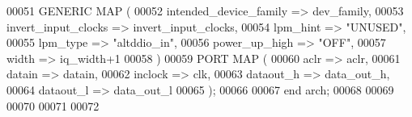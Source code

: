 \begin{DoxyCode}
00051     \textcolor{keywordflow}{GENERIC} \textcolor{keywordflow}{MAP} (
00052         intended\_device\_family  => dev_family,
00053         invert\_input\_clocks         => invert_input_clocks,
00054         lpm\_hint                    => \textcolor{keyword}{"UNUSED"},
00055         lpm\_type                    => \textcolor{keyword}{"altddio\_in"},
00056         power\_up\_high               => \textcolor{keyword}{"OFF"},
00057         width                       => iq\_width+1
00058     \textcolor{vhdlchar}{)}
00059     \textcolor{keywordflow}{PORT} \textcolor{keywordflow}{MAP} (
00060         aclr            => aclr,
00061         datain      => datain,
00062         inclock         => clk,
00063         dataout\_h   => data_out_h,
00064         dataout\_l   => data_out_l
00065     \textcolor{vhdlchar}{)};
00066   
00067 \textcolor{keywordflow}{end} \textcolor{vhdlchar}{arch};   
00068 
00069 
00070 
00071 
00072 
\end{DoxyCode}
